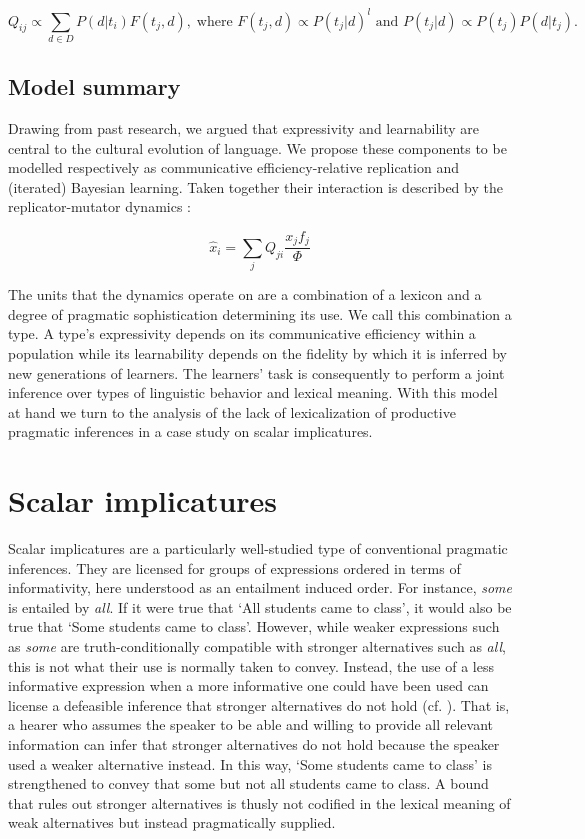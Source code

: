 \documentclass[a4paper]{article}
\begin{document}
\[
 Q_{ij} \propto \sum_{d \in D} P(d|t_i) F(t_j,d), \; \text{where } F(t_j,d) \propto P(t_j|d)^l \text{ and } P(t_j|d) \propto P(t_j) P(d|t_j).
\]

\subsection{Model summary}
Drawing from past research, we argued that expressivity and learnability are central to the cultural evolution of language. We propose these components to be modelled respectively as communicative efficiency-relative replication and (iterated) Bayesian learning. Taken together their interaction is described by the replicator-mutator dynamics \citep{hofbauer+sigmund:2003}: 

\[ 
\hat{x}_i = \sum_j Q_{ji} \frac{x_jf_j}{\Phi}
\]

The units that the dynamics operate on are a combination of a lexicon and a degree of pragmatic sophistication determining its use. We call this combination a type. A type's expressivity depends on its communicative efficiency within a population while its learnability depends on the fidelity by which it is inferred by new generations of learners. The learners' task is consequently to perform a joint inference over types of linguistic behavior and lexical meaning. With this model at hand we turn to the analysis of the lack of lexicalization of productive pragmatic inferences in a case study on scalar implicatures. 


\section{Scalar implicatures}\label{sec:si-case-study}
%
Scalar implicatures are a particularly well-studied type of conventional pragmatic inferences. They are licensed for groups of expressions ordered in terms of informativity, here understood as an entailment induced order. For instance, {\em some} is entailed by {\em all}. If it were true that `All students came to class', it would also be true that `Some students came to class'. However, while weaker expressions such as {\em some} are truth-conditionally compatible with stronger alternatives such as {\em all}, this is not what their use is normally taken to convey. Instead, the use of a less informative expression when a more informative one could have been used can license a defeasible inference that stronger alternatives do not hold (cf. \citealt{horn:1972,gazdar:1979}). That is, a hearer who assumes the speaker to be able and willing to provide all relevant information can infer that stronger alternatives do not hold because the speaker used a weaker alternative instead. In this way, `Some students came to class' is strengthened to convey that some but not all students came to class. A bound that rules out stronger alternatives is thusly not codified in the lexical meaning of weak alternatives but instead pragmatically supplied.
\end{document}
